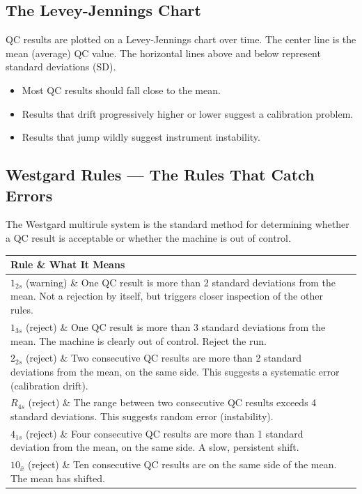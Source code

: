\subsection{The Levey-Jennings Chart}

QC results are plotted on a Levey-Jennings chart over time. The center line is the mean (average) QC value. The horizontal lines above and below represent standard deviations (SD).

\begin{itemize}
    \item Most QC results should fall close to the mean.
    \item Results that drift progressively higher or lower suggest a calibration problem.
    \item Results that jump wildly suggest instrument instability.
\end{itemize}

\subsection{Westgard Rules --- The Rules That Catch Errors}

The Westgard multirule system is the standard method for determining whether a QC result is acceptable or whether the machine is out of control.

\begin{longtable}{@{}ll@{}}
\toprule
\textbf{Rule} \& \textbf{What It Means} \\
\midrule
$1_{2s}$ (warning) \& One QC result is more than 2 standard deviations from the mean. Not a rejection by itself, but triggers closer inspection of the other rules. \\
$1_{3s}$ (reject) \& One QC result is more than 3 standard deviations from the mean. The machine is clearly out of control. Reject the run. \\
$2_{2s}$ (reject) \& Two consecutive QC results are more than 2 standard deviations from the mean, on the same side. This suggests a systematic error (calibration drift). \\
$R_{4s}$ (reject) \& The range between two consecutive QC results exceeds 4 standard deviations. This suggests random error (instability). \\
$4_{1s}$ (reject) \& Four consecutive QC results are more than 1 standard deviation from the mean, on the same side. A slow, persistent shift. \\
$10_{\bar{x}}$ (reject) \& Ten consecutive QC results are on the same side of the mean. The mean has shifted. \\
\bottomrule
\end{longtable}

